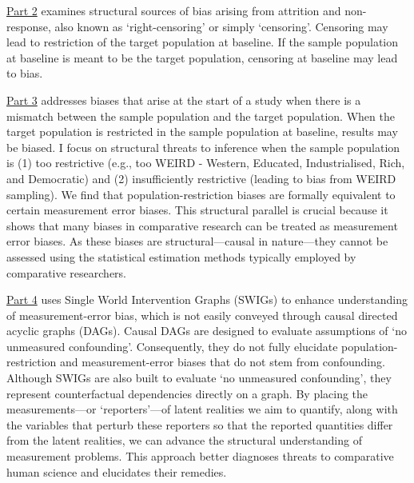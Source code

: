 \documentclass[
  single column]{article}
\begin{document}
\hyperref[id-sec-2]{Part 2} examines structural sources of bias arising
from attrition and non-response, also known as `right-censoring' or
simply `censoring'. Censoring may lead to restriction of the target
population at baseline. If the sample population at baseline is meant to
be the target population, censoring at baseline may lead to bias.

\hyperref[id-sec-3]{Part 3} addresses biases that arise at the start of
a study when there is a mismatch between the sample population and the
target population. When the target population is restricted in the
sample population at baseline, results may be biased. I focus on
structural threats to inference when the sample population is (1) too
restrictive (e.g., too WEIRD - Western, Educated, Industrialised, Rich,
and Democratic) and (2) insufficiently restrictive (leading to bias from
WEIRD sampling). We find that population-restriction biases are formally
equivalent to certain measurement error biases. This structural parallel
is crucial because it shows that many biases in comparative research can
be treated as measurement error biases. As these biases are
structural---causal in nature---they cannot be assessed using the
statistical estimation methods typically employed by comparative
researchers.

\hyperref[id-sec-4]{Part 4} uses Single World Intervention Graphs
(SWIGs) to enhance understanding of measurement-error bias, which is not
easily conveyed through causal directed acyclic graphs (DAGs). Causal
DAGs are designed to evaluate assumptions of `no unmeasured
confounding'. Consequently, they do not fully elucidate
population-restriction and measurement-error biases that do not stem
from confounding. Although SWIGs are also built to evaluate `no
unmeasured confounding', they represent counterfactual dependencies
directly on a graph. By placing the measurements---or `reporters'---of
latent realities we aim to quantify, along with the variables that
perturb these reporters so that the reported quantities differ from the
latent realities, we can advance the structural understanding of
measurement problems. This approach better diagnoses threats to
comparative human science and elucidates their remedies.
\end{document}
